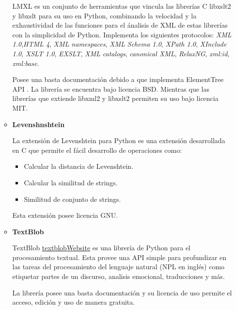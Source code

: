 \begin{itemize}
\begin{itemize}
			LMXL \cite{lxmlWebsite}  es un conjunto de herramientas que vincula las librerías C libxslt2 y libxslt para su uso en Python, combinando la velocidad y la exhaustividad de las funciones para el ánalisis de XML de estas librerías con la simplicidad de Python.	Implementa los siguientes protocolos: \textit{XML 1.0},\textit{HTML 4}, \textit{XML namespaces}, \textit{XML Schema 1.0}, \textit{XPath 1.0},\textit{ XInclude 1.0}, \textit{XSLT 1.0}, \textit{EXSLT}, \textit{XML catalogs}, \textit{canonical XML}, \textit{RelaxNG}, \textit{xml:id}, \textit{xml:base}.		
			
			Posee una basta documentación debido a que implementa 
			 ElementTree API \cite{elementTree}. La librería se encuentra bajo licencia BSD. Mientras que las librerías que extiende libxml2 y libxslt2 permiten su uso bajo licencia MIT.
			
			\item \textbf{Levenshnshtein}
			
			La extensión de Levenshtein \cite{pythonLeven} para Python es una extensión desarrollada en C que permite el fácil desarrollo de operaciones como: 
			\begin{itemize}
				\item Calcular la distancia de Levenshtein.
				\item Calcular la similitud de strings.
				\item Similitud de conjunto de strings.
			\end{itemize}
			
			Esta extensión posee licencia GNU.
			
			\item \textbf{TextBlob}
			
			TextBlob \url{textblobWebsite} es una librería de Python para el procesamiento textual. Esta provee una API simple para profundizar en las tareas  del procesamiento del lenguaje natural (NPL en inglés) como etiquetar partes de un discurso, analisis emocional, traducciones y más.
			
			La librería posee una basta documentación y su licencia de uso permite el acceso, edición y uso de manera gratuita.
		\end{itemize}
\end{itemize}